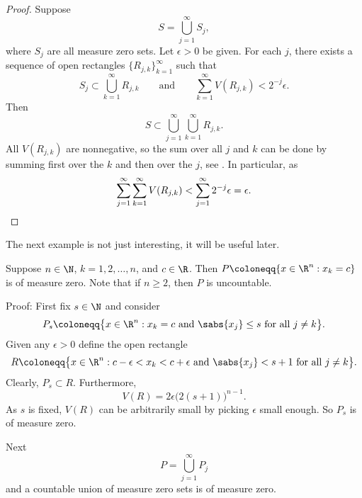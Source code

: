 \begin{proof}
Suppose
\begin{equation*}
S = \bigcup_{j=1}^\infty S_j ,
\end{equation*}
where $S_j$ are all measure zero sets.  Let $\epsilon > 0$ be given.
For each $j$,
there exists a sequence of open rectangles $\{ R_{j,k} \}_{k=1}^\infty$
such that
\begin{equation*}
S_j \subset \bigcup_{k=1}^\infty R_{j,k}
\qquad \text{and} \qquad
\sum_{k=1}^\infty V(R_{j,k}) < 2^{-j} \epsilon .
\end{equation*}
Then
\begin{equation*}
S \subset \bigcup_{j=1}^\infty \bigcup_{k=1}^\infty R_{j,k} .
\end{equation*}
All $V(R_{j,k})$ are nonnegative, so the sum over all $j$ and $k$
can be done by summing first over the $k$ and then over the $j$,
see
.
In particular, as
\begin{equation*}
\sum_{j=1}^\infty \sum_{k=1}^\infty V(R_{j,k}) <
\sum_{j=1}^\infty 2^{-j} \epsilon = \epsilon . \qedhere
\end{equation*}
\end{proof}

The next example is not just interesting, it will be useful later.

\begin{example} \label{mv:example:planenull}
Suppose
$n \in \N$, $k=1,2,\ldots,n$, and $c \in \R$.
Then $P \coloneqq \{ x \in \R^n : x_k = c \}$ is of measure zero.
Note that if $n \geq 2$, then $P$ is uncountable.

Proof:
First fix $s \in \N$ and consider
\begin{equation*}
P_s \coloneqq \bigl\{ x \in \R^n : x_k = c \text{ and } \sabs{x_j} \leq s
\text{ for all } j\not=k \bigr\} .
\end{equation*}
Given any $\epsilon > 0$ define the open rectangle
\begin{equation*}
R \coloneqq \bigl\{ x \in \R^n : c-\epsilon < x_k < c+\epsilon \text{ and } \sabs{x_j} < s+1
\text{ for all } j\not=k \bigr\} .
\end{equation*}
Clearly, $P_s \subset R$.  Furthermore,
\begin{equation*}
V(R) = 2\epsilon {\bigl(2(s+1)\bigr)}^{n-1} .
\end{equation*}
As $s$ is fixed,
$V(R)$ can be
arbitrarily small by
picking $\epsilon$ small enough.
So $P_s$ is of measure zero.

Next 
\begin{equation*}
P = \bigcup_{j=1}^\infty P_j
\end{equation*}
and a countable union of measure zero sets is of measure zero.
\end{example}

